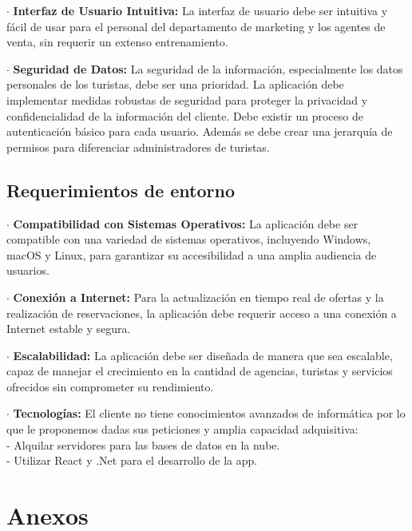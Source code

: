 \documentclass{article}
\begin{document}
    $\cdot$ \textbf{Interfaz de Usuario Intuitiva:}
        La interfaz de usuario debe ser intuitiva y fácil de usar para el personal del departamento de marketing 
        y los agentes de venta, sin requerir un extenso entrenamiento.

    $\cdot$ \textbf{Seguridad de Datos:}
        La seguridad de la información, especialmente los datos personales de los turistas, debe ser una prioridad. 
        La aplicación debe implementar medidas robustas de seguridad para proteger la privacidad y confidencialidad 
        de la información del cliente. Debe existir un proceso de autenticación básico para cada usuario. Además se 
        debe crear una jerarquía de permisos para diferenciar administradores de turistas. 

\subsection{Requerimientos de entorno}
    $\cdot$ \textbf{Compatibilidad con Sistemas Operativos:}
        La aplicación debe ser compatible con una variedad de sistemas operativos, incluyendo Windows, macOS y Linux, 
        para garantizar su accesibilidad a una amplia audiencia de usuarios.

    $\cdot$ \textbf{Conexión a Internet:}
        Para la actualización en tiempo real de ofertas y la realización de reservaciones, la aplicación debe requerir 
        acceso a una conexión a Internet estable y segura.

    $\cdot$ \textbf{Escalabilidad:}
        La aplicación debe ser diseñada de manera que sea escalable, capaz de manejar el crecimiento en la cantidad de 
        agencias, turistas y servicios ofrecidos sin comprometer su rendimiento.

    $\cdot$ \textbf{Tecnologías:}
        El cliente no tiene conocimientos avanzados de informática por lo que le proponemos dadas sus peticiones y amplia 
        capacidad adquisitiva: \\ 
        - Alquilar servidores para las bases de datos en la nube. \\
        - Utilizar React y .Net para el desarrollo de la app.
\newpage
\section{Anexos}
\end{document}

